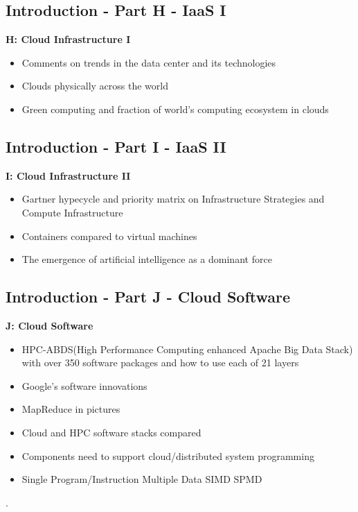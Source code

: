\subsection{Introduction - Part H - IaaS I}\label{s:cloud-fundamentals-h}


\textbf{H: Cloud Infrastructure I}
\begin{itemize}
\item Comments on trends in the data center and its technologies
\item Clouds physically across the world
\item Green computing and fraction of world's computing ecosystem in
  clouds
\end{itemize}

\subsection{Introduction - Part I - IaaS II}\label{s:cloud-fundamentals-i}

\textbf{I: Cloud Infrastructure II}
\begin{itemize}
\item Gartner hypecycle and priority matrix on Infrastructure
  Strategies and Compute Infrastructure
\item Containers compared to virtual machines
\item The emergence of artificial intelligence as a dominant force
\end{itemize}

\subsection{Introduction - Part J - Cloud Software}\label{s:cloud-fundamentals-j}


\textbf{J: Cloud Software}
\begin{itemize}
\item HPC-ABDS(High Performance Computing enhanced Apache Big Data
  Stack) with over 350 software packages and how to use each of 21
  layers
\item Google's software innovations
\item MapReduce in pictures
\item Cloud and HPC software stacks compared
\item Components need to support cloud/distributed system programming
\item Single Program/Instruction Multiple Data SIMD SPMD
\end{itemize}.

